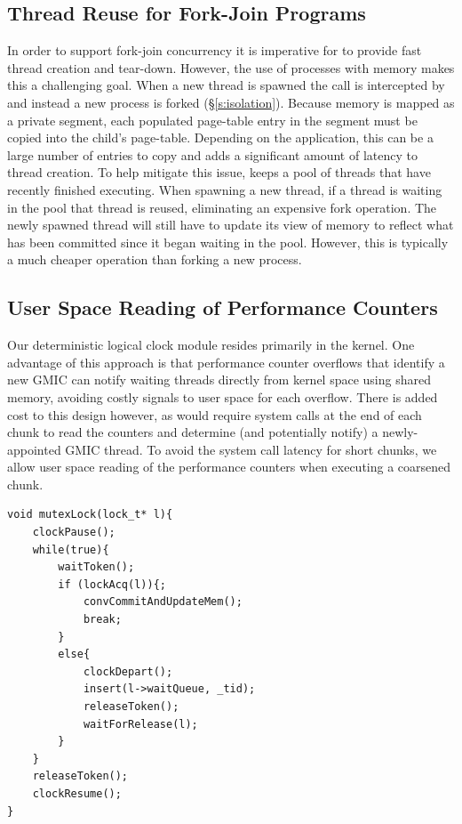 \subsection{Thread Reuse for Fork-Join Programs}

In order to support fork-join concurrency it is imperative for \lib{} to provide fast thread creation and tear-down. However, the use of processes with \conversion{} memory makes this a challenging goal. When a new thread is spawned the call is intercepted by \lib{} and instead a new process is forked (\S\ref{s:isolation}). Because \conversion{} memory is mapped as a private segment, each populated page-table entry in the \conversion{} segment must be copied into the child's page-table. Depending on the application, this can be a large number of entries to copy and adds a significant amount of latency to thread creation. To help mitigate this issue, \lib{} keeps a pool of threads that have recently finished executing. When spawning a new thread, if a thread is waiting in the pool that thread is reused, eliminating an expensive fork operation. The newly spawned thread will still have to update its view of memory to reflect what has been committed since it began waiting in the pool. However, this is typically a much cheaper operation than forking a new process.

\subsection{User Space Reading of Performance Counters}

Our deterministic logical clock module resides primarily in the kernel. One advantage of this approach is that performance counter overflows that identify a new GMIC can notify waiting threads directly from kernel space using shared memory, avoiding costly signals to user space for each overflow. There is added cost to this design however, as \lib{} would require system calls at the end of each chunk to read the counters and determine (and potentially notify) a newly-appointed GMIC thread. To avoid the system call latency for short chunks, we allow user space reading of the performance counters when executing a coarsened chunk.


\newsavebox{\mutexLock}
\begin{lrbox}{\mutexLock}%
\begin{lstlisting}
void mutexLock(lock_t* l){
	clockPause();
	while(true){
		waitToken();
		if (lockAcq(l)){;
			convCommitAndUpdateMem();
			break;
		}
		else{
			clockDepart();
			insert(l->waitQueue, _tid);
			releaseToken();
			waitForRelease(l);
		}
	}
	releaseToken();
	clockResume();
}
\end{lstlisting}
\end{lrbox}


